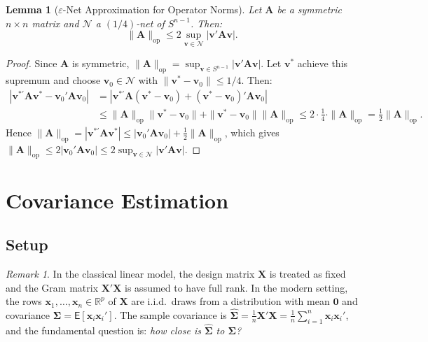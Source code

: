 \documentclass[14pt]{extarticle}
\theoremstyle{plain}
\newtheorem{lemma}[theorem]{Lemma}
\theoremstyle{definition}
\theoremstyle{remark}
\newtheorem*{remark}{Remark}
\newcommand\expc{\mathsf{E}}
\newcommand{\bX}{\mathbf{X}}
\newcommand{\bx}{\mathbf{x}}
\newcommand{\bzero}{\mathbf{0}}
\newcommand{\bA}{\mathbf{A}}
\newcommand{\bv}{\mathbf{v}}
\newcommand{\Real}{\mathbb{R}}
\newcommand{\calN}{\mathcal{N}}
\newcommand{\bSigma}{\boldsymbol{\Sigma}}
\newcommand{\hbSigma}{\hat{\boldsymbol{\Sigma}}}
\newcommand{\opnorm}[1]{\|#1\|_{\mathrm{op}}}
\begin{document}
\begin{lemma}[$\varepsilon$-Net Approximation for Operator Norms]\label{lem:eps-net-approx}
Let $\bA$ be a symmetric $n \times n$ matrix and $\calN$ a $(1/4)$-net of $S^{n-1}$. Then:
\begin{equation}\label{eq:eps-net-approx}
\opnorm{\bA} \leqslant 2\sup_{\bv \in \calN} |\bv'\bA\bv|.
\end{equation}
\end{lemma}

\begin{proof}
Since $\bA$ is symmetric, $\opnorm{\bA} = \sup_{\bv \in S^{n-1}} |\bv'\bA\bv|$. Let $\bv^*$ achieve this supremum and choose $\bv_0 \in \calN$ with $\|\bv^* - \bv_0\| \leqslant 1/4$. Then:
\begin{align*}
|\bv^{*\prime}\bA\bv^* - \bv_0'\bA\bv_0| &= |\bv^{*\prime}\bA(\bv^* - \bv_0) + (\bv^* - \bv_0)'\bA\bv_0|\\
&\leqslant \opnorm{\bA}\|\bv^* - \bv_0\| + \|\bv^* - \bv_0\|\opnorm{\bA} \leqslant 2\cdot\frac{1}{4}\cdot\opnorm{\bA} = \frac{1}{2}\opnorm{\bA}.
\end{align*}
Hence $\opnorm{\bA} = |\bv^{*\prime}\bA\bv^*| \leqslant |\bv_0'\bA\bv_0| + \frac{1}{2}\opnorm{\bA}$, which gives $\opnorm{\bA} \leqslant 2|\bv_0'\bA\bv_0| \leqslant 2\sup_{\bv \in \calN}|\bv'\bA\bv|$.
\end{proof}

\section{Covariance Estimation}\label{sec:covariance}

\subsection{Setup}

\begin{remark}
In the classical linear model, the design matrix $\bX$ is treated as fixed and the Gram matrix $\bX'\bX$ is assumed to have full rank. In the modern setting, the rows $\bx_1, \ldots, \bx_n \in \Real^p$ of $\bX$ are i.i.d.\ draws from a distribution with mean $\bzero$ and covariance $\bSigma = \expc[\bx_i\bx_i']$. The sample covariance is $\hbSigma = \frac{1}{n}\bX'\bX = \frac{1}{n}\sum_{i=1}^n \bx_i\bx_i'$, and the fundamental question is: \emph{how close is $\hbSigma$ to $\bSigma$?}
\end{remark}
\end{document}
